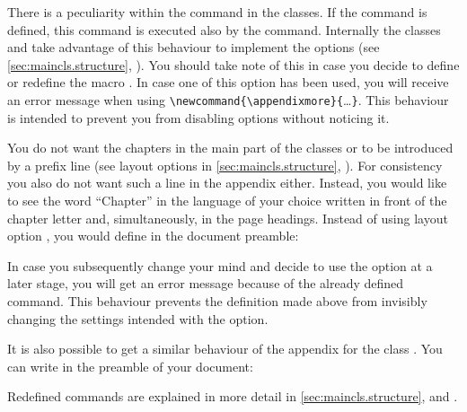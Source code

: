 \begin{Declaration}
\end{Declaration}%
There is a peculiarity within the  command in
the {\KOMAScript} classes. If the command  is defined,
this command is executed also by the 
command. Internally the {\KOMAScript} classes
 and
 take advantage of this behaviour to implement the options
 (see \autoref{sec:maincls.structure},
). You  should
take note of this in case you decide to define or redefine the macro
. In case one of this option has been used, you will
receive an error message when using
\verb|\newcommand{\appendixmore}{|\dots\verb|}|. This behaviour is intended to
prevent you from disabling options without noticing it.

\begin{Example}
  You do not want the chapters in the main part of the classes 
  or  to be introduced by a prefix line (see layout options
   in \autoref{sec:maincls.structure},
  ). For consistency you also
  do not want such a line in the appendix either. Instead, you would like to
  see the word ``Chapter'' in the language of your choice written in front of
  the chapter letter and, simultaneously, in the page headings.  Instead of
  using layout option , you would define in the
  document preamble:
%
\begin{lstcode}
  \newcommand*{\appendixmore}{%
    \renewcommand*{\chapterformat}{%
      \appendixname~\thechapter\autodot\enskip}
    \renewcommand*{\chaptermarkformat}{%
      \appendixname~\thechapter\autodot\enskip}
  }
\end{lstcode}
%  
  In case you subsequently change your mind and decide to use the option
   at a later stage, you will get an
  error message because of the already defined  command.
  This behaviour prevents the definition made above from invisibly changing
  the settings intended with the option.
  
  It is also possible to get a similar behaviour of the appendix for
  the class . You can write in the preamble of your
  document:
\begin{lstcode}[moretexcs={ifthenelse,equal}]
  \newcommand*{\appendixmore}{%
    \renewcommand*{\sectionformat}{%
      \appendixname~\thesection\autodot\enskip}%
    \renewcommand*{\sectionmarkformat}{%
      \appendixname~\thesection\autodot\enskip}}
\end{lstcode}
  
  Redefined commands are explained in more detail in
  \autoref{sec:maincls.structure},
   and
  .
\end{Example}
%
\EndIndexGroup


